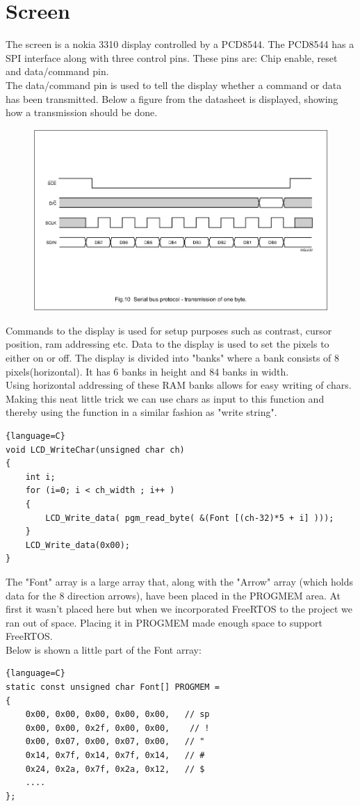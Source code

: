 \section{Screen}
The screen is a nokia 3310 display controlled by a PCD8544. The PCD8544 has a SPI interface along with three control pins. These pins are: Chip enable, reset and data/command pin.\\
The data/command pin is used to tell the display whether a command or data has been transmitted. Below a figure from the datasheet is displayed, showing how a transmission should be done.

\begin{figure}[H]
\centering
\includegraphics[width=.8\textwidth]{billeder/Display_protocol}
\end{figure}

Commands to the display is used for setup purposes such as contrast, cursor position, ram addressing etc. Data to the display is used to set the pixels to either on or off. The display is divided into "banks" where a bank consists of 8 pixels(horizontal). It has 6 banks in height and 84 banks in width.\\
Using horizontal addressing of these RAM banks allows for easy writing of chars. Making this neat little trick we can use chars as input to this function and thereby using the function in a similar fashion as "write string".
\begin{lstlisting}{language=C}
void LCD_WriteChar(unsigned char ch)
{
	int i;
	for (i=0; i < ch_width ; i++ )
	{
		LCD_Write_data( pgm_read_byte( &(Font [(ch-32)*5 + i] )));	
	}
	LCD_Write_data(0x00);			
}
\end{lstlisting}
The "Font" array is a large array that, along with the "Arrow" array (which holds data for the 8 direction arrows), have been placed in the PROGMEM area. At first it wasn't placed here but when we incorporated FreeRTOS to the project we ran out of space. Placing it in PROGMEM made enough space to support FreeRTOS.\\
Below is shown a little part of the Font array:
\begin{lstlisting}{language=C}
static const unsigned char Font[] PROGMEM =
{
	0x00, 0x00, 0x00, 0x00, 0x00,   // sp 
	0x00, 0x00, 0x2f, 0x00, 0x00,    // ! 
	0x00, 0x07, 0x00, 0x07, 0x00,   // "  
	0x14, 0x7f, 0x14, 0x7f, 0x14,   // #  
	0x24, 0x2a, 0x7f, 0x2a, 0x12,   // $  
	....  
};
\end{lstlisting}

